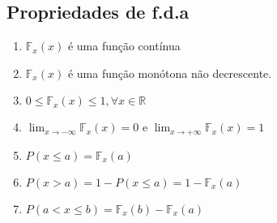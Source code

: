 \documentclass[11pt,a4paper]{book}
\begin{document}
 \subsection{Propriedades de f.d.a}
 \begin{enumerate}[label=(\alph*)]
   \item $\mathbb{F}_{x}(x)$  é uma função contínua
   \item $\mathbb{F}_{x}(x)$ é uma função monótona não decrescente. 
   \item  $0 \le \mathbb{F}_{x}(x)\le 1, \forall x \in \mathbb{R}$
   \item $ \lim_{x \to -\infty} \mathbb{F}_{x}(x)=0$ e $ \lim_{x \to +\infty} \mathbb{F}_{x}(x)=1$
   \item $P(x \le a) = \mathbb{F}_{x}(a)$
   \item $P(x>a)=1 - P(x \le a)= 1 - \mathbb{F}_{x}(a)$
   \item $P(a<x\le b)= \mathbb{F}_{x}(b)- \mathbb{F}_{x}(a)$
 \end{enumerate}
\end{document}
